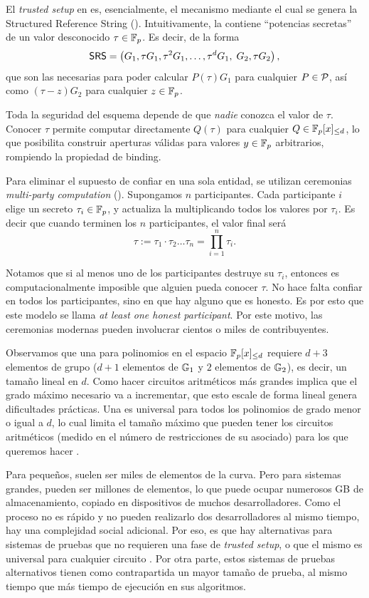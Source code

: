 El \textit{trusted setup} en \KZG es, esencialmente, el mecanismo mediante el cual se genera la Structured Reference String (\SRS). Intuitivamente, la \SRS contiene “potencias secretas” de un valor desconocido $\tau \in \mathbb{F}_p$. Es decir, de la forma
$$\textsf{SRS} = \left(G_1, \tau G_1, \tau^2 G_1, \ldots, \tau^d G_1,\; G_2, \tau G_2 \right),$$
que son las necesarias para poder calcular $P(\tau)G_1$ para cualquier $P \in \mathcal{P}$, así como $(\tau - z)G_2$ para cualquier $z \in  \mathbb{F}_p$.

Toda la seguridad del esquema depende de que \emph{nadie} conozca el valor de $\tau$. Conocer $\tau$ permite computar directamente $Q(\tau)$ para cualquier $Q \in \mathbb{F}_p[x]_{\leq d}$, lo que posibilita construir aperturas válidas para valores $y \in \mathbb{F}_p$ arbitrarios, rompiendo la propiedad de binding.

Para eliminar el supuesto de confiar en una sola entidad, se utilizan ceremonias \emph{multi-party computation} (\MPC). Supongamos $n$ participantes. Cada participante $i$ elige un secreto $\tau_i \in \mathbb{F}_p$, y actualiza la \SRS multiplicando todos los valores por $\tau_i$. Es decir que cuando terminen los $n$ participantes, el valor final será
$$\tau := \tau_1 \cdot \tau_2 \ldots \tau_n = \prod_{i=1}^{n} \tau_i.$$

Notamos que si al menos uno de los participantes destruye su $\tau_i$, entonces es computacionalmente imposible que alguien pueda conocer $\tau$. No hace falta confiar en todos los participantes, sino en que hay alguno que es honesto. Es por esto que este modelo se llama \emph{at least one honest participant}. Por este motivo, las ceremonias modernas pueden involucrar cientos o miles de contribuyentes.

Observamos que una \SRS para polinomios en el espacio $ \mathbb{F}_p[x]_{\leq d}$ requiere $d + 3$ elementos de grupo ($d + 1$ elementos de $\mathbb{G}_1$ y $2$ elementos de $\mathbb{G}_2$), es decir, un tamaño lineal en $d$. Como hacer circuitos aritméticos más grandes implica que el grado máximo necesario va a incrementar, que esto escale de forma lineal genera dificultades prácticas. Una \SRS \KZG es universal para todos los polinomios de grado menor o igual a $d$, lo cual limita el tamaño máximo que pueden tener los circuitos aritméticos (medido en el número de restricciones de su \ROneCS asociado) para los que queremos hacer \SNARK.

Para \SNARK pequeños, suelen ser miles de elementos de la curva. Pero para sistemas grandes, pueden ser millones de elementos, lo que puede ocupar numerosos GB de almacenamiento, copiado en dispositivos de muchos desarrolladores. Como el proceso no es rápido y no pueden realizarlo dos desarrolladores al mismo tiempo, hay una complejidad social adicional. Por eso, es que hay alternativas para sistemas de pruebas que no requieren una fase de \textit{trusted setup}, o que el mismo es universal para cualquier circuito \cite{cryptoeprint:2019/953, BenSasson2017FastRI, cryptoeprint:2018/046}. Por otra parte, estos sistemas de pruebas alternativos tienen como contrapartida un mayor tamaño de prueba, al mismo tiempo que más tiempo de ejecución en sus algoritmos.


